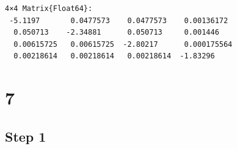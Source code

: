 \documentclass[
  letterpaper,
  DIV=11,
  numbers=noendperiod]{scrreprt}
\begin{document}
\begin{verbatim}
4×4 Matrix{Float64}:
 -5.1197       0.0477573    0.0477573    0.00136172
  0.050713    -2.34881      0.050713     0.001446
  0.00615725   0.00615725  -2.80217      0.000175564
  0.00218614   0.00218614   0.00218614  -1.83296
\end{verbatim}

\hypertarget{section-4}{%
\section{7}\label{section-4}}

\hypertarget{step-1}{%
\subsection{Step 1}\label{step-1}}
\end{document}

